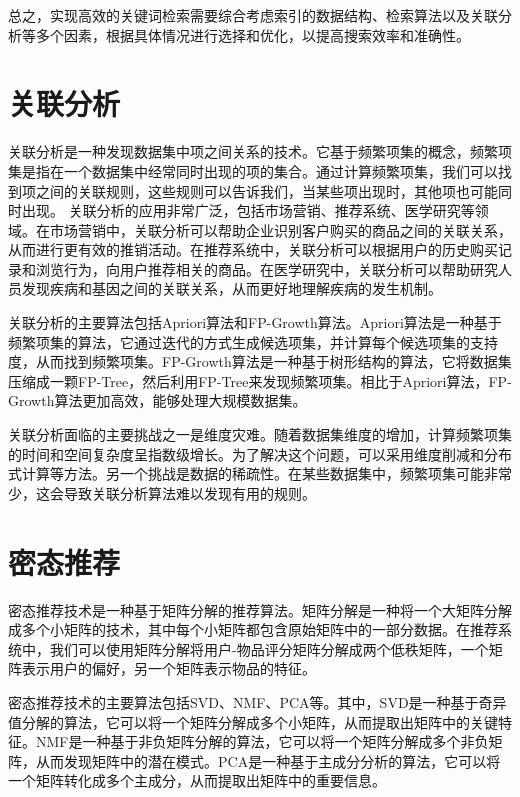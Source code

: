\documentclass[promaster]{thesis-uestc}
\begin{document}
总之，实现高效的关键词检索需要综合考虑索引的数据结构、检索算法以及关联分析等多个因素，根据具体情况进行选择和优化，以提高搜索效率和准确性。

\section{关联分析}
关联分析是一种发现数据集中项之间关系的技术。它基于频繁项集的概念，频繁项集是指在一个数据集中经常同时出现的项的集合。通过计算频繁项集，我们可以找到项之间的关联规则，这些规则可以告诉我们，当某些项出现时，其他项也可能同时出现。
关联分析的应用非常广泛，包括市场营销、推荐系统、医学研究等领域。在市场营销中，关联分析可以帮助企业识别客户购买的商品之间的关联关系，从而进行更有效的推销活动。在推荐系统中，关联分析可以根据用户的历史购买记录和浏览行为，向用户推荐相关的商品。在医学研究中，关联分析可以帮助研究人员发现疾病和基因之间的关联关系，从而更好地理解疾病的发生机制。

关联分析的主要算法包括Apriori算法和FP-Growth算法。Apriori算法是一种基于频繁项集的算法，它通过迭代的方式生成候选项集，并计算每个候选项集的支持度，从而找到频繁项集。FP-Growth算法是一种基于树形结构的算法，它将数据集压缩成一颗FP-Tree，然后利用FP-Tree来发现频繁项集。相比于Apriori算法，FP-Growth算法更加高效，能够处理大规模数据集。

关联分析面临的主要挑战之一是维度灾难。随着数据集维度的增加，计算频繁项集的时间和空间复杂度呈指数级增长。为了解决这个问题，可以采用维度削减和分布式计算等方法。另一个挑战是数据的稀疏性。在某些数据集中，频繁项集可能非常少，这会导致关联分析算法难以发现有用的规则。

\section{密态推荐}
密态推荐技术是一种基于矩阵分解的推荐算法。矩阵分解是一种将一个大矩阵分解成多个小矩阵的技术，其中每个小矩阵都包含原始矩阵中的一部分数据。在推荐系统中，我们可以使用矩阵分解将用户-物品评分矩阵分解成两个低秩矩阵，一个矩阵表示用户的偏好，另一个矩阵表示物品的特征。

密态推荐技术的主要算法包括SVD、NMF、PCA等。其中，SVD是一种基于奇异值分解的算法，它可以将一个矩阵分解成多个小矩阵，从而提取出矩阵中的关键特征。NMF是一种基于非负矩阵分解的算法，它可以将一个矩阵分解成多个非负矩阵，从而发现矩阵中的潜在模式。PCA是一种基于主成分分析的算法，它可以将一个矩阵转化成多个主成分，从而提取出矩阵中的重要信息。
\end{document}
